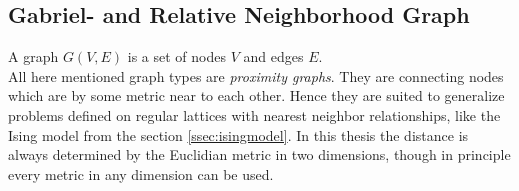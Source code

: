 \subsection{Gabriel- and Relative Neighborhood Graph}
\label{ssec:graphtypes}
    A graph \(G(V,E)\) is a set of nodes \(V\) and edges \(E\).\\
    All here mentioned graph types are \emph{proximity graphs}. They are
    connecting nodes which are by some metric near to each other.
    Hence they are suited to generalize problems defined on regular
    lattices with nearest neighbor relationships, like the Ising model
    from the section \ref{ssec:isingmodel}.
    In this thesis the distance is always determined by the Euclidian
    metric in two dimensions, though in principle every metric in any
    dimension can be used.\\

